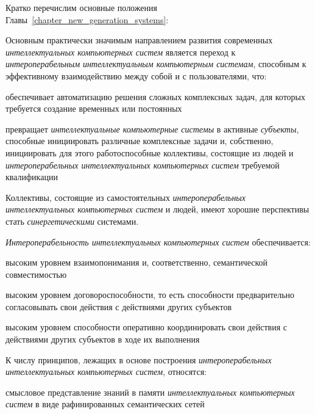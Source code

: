 Кратко перечислим основные положения Главы~\ref{chapter_new_generation_systems}:

\begin{textitemize}
	\item Основным практически значимым направлением развития современных \textit{интеллектуальных компьютерных систем} является переход к \textit{интероперабельным} \textit{интеллектуальным компьютерным системам}, способным к эффективному взаимодействию между собой и с пользователями, что:
	\begin{textitemize}
		\item обеспечивает автоматизацию решения сложных комплексных задач, для которых требуется создание временных или постоянных 
		\item превращает \textit{интеллектуальные компьютерные системы} в  активные \textit{субъекты}, способные инициировать различные комплексные задачи и, собственно, инициировать для этого работоспособные коллективы, состоящие из людей и \textit{интероперабельных интеллектуальных компьютерных систем} требуемой квалификации 
	\end{textitemize}
	\item Коллективы, состоящие из самостоятельных \textit{интероперабельных интеллектуальных компьютерных систем} и людей, имеют хорошие перспективы стать \textit{синергетическими} системами.\\
	\item \textit{Интероперабельность интеллектуальных компьютерных систем} обеспечивается:
	\begin{textitemize}
		\item высоким уровнем взаимопонимания и, соответственно, семантической совместимостью
		\item высоким уровнем договороспособности, то есть способности предварительно согласовывать свои действия с действиями других субъектов
		\item высоким уровнем способности оперативно координировать свои действия с действиями других субъектов в ходе их выполнения
	\end{textitemize}
	\item К числу принципов, лежащих в основе построения \textit{интероперабельных интеллектуальных компьютерных систем}, относятся:
	\begin{textitemize}
		\item смысловое представление знаний в памяти \textit{интеллектуальных компьютерных систем} в виде рафинированных семантических сетей

\end{textitemize}
\end{textitemize}
